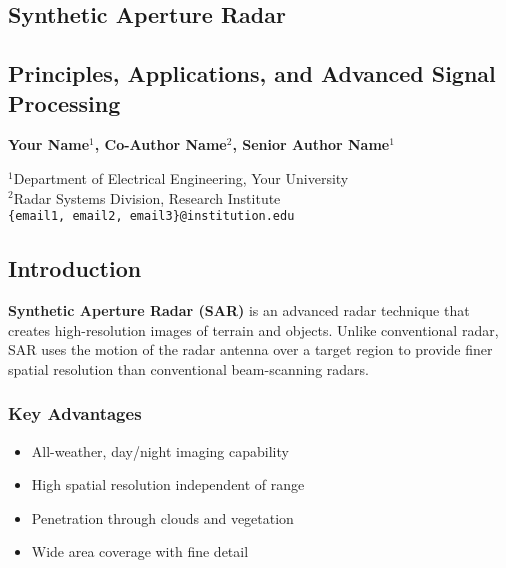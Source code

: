 \documentclass[a0paper,landscape,20pt]{extarticle}
\begin{document}
\begin{multicols}{4}


\section{Synthetic Aperture Radar}
\subsection{Principles, Applications, and Advanced Signal Processing}

\vspace{0.3cm}
\textbf{\Large Your Name$^1$, Co-Author Name$^2$, Senior Author Name$^1$}

\normalsize
$^1$Department of Electrical Engineering, Your University\\
$^2$Radar Systems Division, Research Institute\\
\texttt{\{email1, email2, email3\}@institution.edu}

\vspace{1.0cm}

\subsection{Introduction}

\textbf{Synthetic Aperture Radar (SAR)} is an advanced radar technique that creates high-resolution images of terrain and objects. Unlike conventional radar, SAR uses the motion of the radar antenna over a target region to provide finer spatial resolution than conventional beam-scanning radars.

\subsubsection{Key Advantages}
\begin{itemize}
  \item All-weather, day/night imaging capability
  \item High spatial resolution independent of range
  \item Penetration through clouds and vegetation
  \item Wide area coverage with fine detail
\end{itemize}


\end{multicols}
\end{document}
